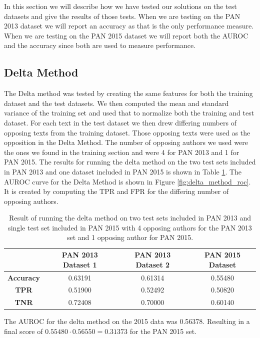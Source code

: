 In this section we will describe how we have tested our solutions on the test
datasets and give the results of those tests. When we are testing on the PAN
2013 dataset we will report an accuracy as that is the only performance measure.
When we are testing on the PAN 2015 dataset we will report both the \gls{AUROC}
and the accuracy since both are used to measure performance.

\subsection{Delta Method} \label{subsec:results:delta_method}
The Delta method was tested by creating the same features for both the training
dataset and the test datasets. We then computed the mean and standard variance
of the training set and used that to normalize both the training and test
dataset. For each text in the test dataset we then drew differing numbers of
opposing texts from the training dataset. Those opposing texts were used as
the opposition in the Delta Method. The number of opposing authors we used
were the ones we found in the training section and were 4 for PAN 2013 and 1
for PAN 2015. The results for running the delta method on the two test sets
included in PAN 2013 and one dataset included in PAN 2015 is shown in Table
\ref{tab:delta_method_final_results}. The \gls{AUROC} curve for the Delta Method
is shown in Figure \ref{fig:delta_method_roc}. It is created by computing the
\gls{TPR} and \gls{FPR} for the differing number of opposing authors.

\begin{table}
    \centering
    \begin{tabular}{c|ccc}
        & \textbf{PAN 2013 Dataset 1} & \textbf{PAN 2013 Dataset 2} & \textbf{PAN 2015 Dataset}\\
        \hline
        \textbf{Accuracy}  & 0.63191 & 0.61314 & 0.55480 \\
        \textbf{\gls{TPR}} & 0.51900 & 0.52492 & 0.50820 \\
        \textbf{\gls{TNR}} & 0.72408 & 0.70000 & 0.60140
    \end{tabular}
    \caption{Result of running the delta method on two test sets included in PAN
    2013 and single test set included in PAN 2015 with 4 opposing authors for
    the PAN 2013 set and 1 opposing author for PAN 2015.}
    \label{tab:delta_method_final_results}
\end{table}

The \gls{AUROC} for the delta method on the 2015 data was 0.56378. Resulting
in a final score of $0.55480 \cdot 0.56550 = 0.31373$ for the PAN 2015 set.

